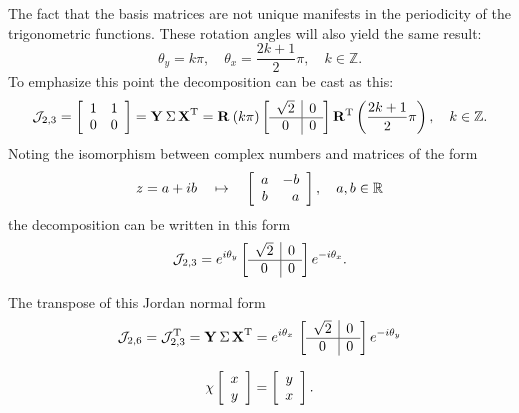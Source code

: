 The fact that the basis matrices are not unique manifests in the periodicity of the trigonometric functions. These rotation angles will also yield the same result:
\begin{equation}
  \theta_{y} = k\pi, \quad \theta_{x} = \frac{2k+1}{2}\pi, \quad k\in\mathbb{Z}.
\end{equation}
To emphasize this point the decomposition can be cast as this:
\begin{equation}
  \begin{split}
    \mathcal{J}_{2,3} = \mat{cc}{1&1\\0&0} = \svd{T} = \rat{k\pi}{}\mat{c|c}{\sqrt{2} & 0\\\hline0 & 0}\rat{\frac{2k+1}{2}\pi}{T},\quad k\in\mathbb{Z}. 
  \end{split}
\end{equation}
Noting the isomorphism between complex numbers and matrices of the form
\begin{equation}
  z = a + ib \quad \mapsto \quad \mat{cr}{a&-b\\b&a}, \quad a,b\in\real{}
\end{equation}
the decomposition can be written in this form
\begin{equation}
  \begin{split}
    \mathcal{J}_{2,3} = e^{i \theta_{y}}\mat{c|c}{\sqrt{2} & 0\\\hline0 & 0}e^{-i \theta_{x}}.
  \end{split}
\end{equation}

The transpose of this Jordan normal form 
\begin{equation}
    \mathcal{J}_{2,6} = \mathcal{J}_{2,3}^{\mathrm{T}}= \svd{T} 
    = e^{i\theta_{x}}\, \mat{c|c}{\sqrt{2} & 0\\\hline0 & 0} e^{-i\theta_{y}}
\end{equation}

\begin{equation}
  \chi \mat{c}{x\\y} = \mat{c}{y\\x}.
\end{equation}

\endinput
